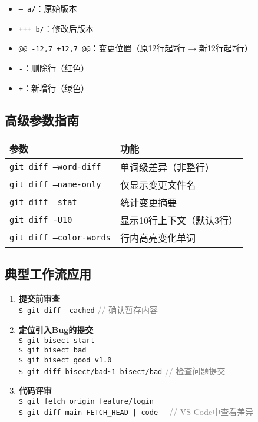 \begin{itemize}[leftmargin=*, nosep]
    \item \texttt{--- a/}：原始版本
    \item \texttt{+++ b/}：修改后版本
    \item \texttt{@@ -12,7 +12,7 @@}：变更位置（原12行起7行 → 新12行起7行）
    \item \texttt{-}：删除行（红色）
    \item \texttt{+}：新增行（绿色）
\end{itemize}

\subsection{高级参数指南}
\begin{center}
\begin{tabular}{@{}ll@{}}
    \toprule
    \textbf{参数} & \textbf{功能} \\
    \midrule
    \texttt{git diff --word-diff} & 单词级差异（非整行） \\
    \texttt{git diff --name-only} & 仅显示变更文件名 \\
    \texttt{git diff --stat} & 统计变更摘要 \\
    \texttt{git diff -U10} & 显示10行上下文（默认3行） \\
    \texttt{git diff --color-words} & 行内高亮变化单词 \\
    \bottomrule
\end{tabular}
\end{center}

\subsection{典型工作流应用}
\begin{enumerate}[leftmargin=*, nosep]
    \item \textbf{提交前审查} \\
    \texttt{\$ git diff --cached} \quad \textcolor{gray}{// 确认暂存内容}
    
    \item \textbf{定位引入Bug的提交} \\
    \texttt{\$ git bisect start} \\
    \texttt{\$ git bisect bad} \\
    \texttt{\$ git bisect good v1.0} \\
    \texttt{\$ git diff bisect/bad\textasciitilde1 bisect/bad} \quad \textcolor{gray}{// 检查问题提交}
    
    \item \textbf{代码评审} \\
    \texttt{\$ git fetch origin feature/login} \\
    \texttt{\$ git diff main FETCH\_HEAD | code -} \quad \textcolor{gray}{// VS Code中查看差异}
\end{enumerate}

